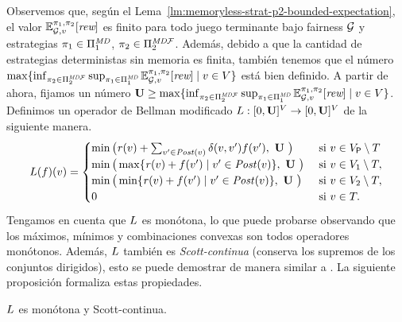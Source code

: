 Observemos que, según el Lema~\ref{lm:memoryless-strat-p2-bounded-expectation}, el valor $\mathbb{E}^{\pi_{1}, \pi_{2}}_{\mathcal{G},v}[\textit{rew}]$ es finito
para todo juego terminante bajo fairness $\mathcal{G}$ y estrategias $\pi_{1} \in \Pi^{\textit{MD}}_{1}$, $\pi_{2} \in \Pi^{\textit{MD}\mathcal{F}}_{2}$.
Además, debido a que la cantidad de estrategias deterministas sin memoria es finita, también tenemos que el número $\max \{ \inf_{\pi_{2} \in \Pi^{\textit{MD}\mathcal{F}}_{2}} \sup_{\pi_{1} \in \Pi^{\textit{MD}}_{1}} \mathbb{E}^{\pi_{1}, \pi_{ 2}}_{\mathcal{G},v}[\textit{rew}] \mid v \in V \}$ está bien definido.
A partir de ahora, fijamos un número $\mathbf{U} \geq \max \{ \inf_{\pi_{2} \in \Pi^{\textit{MD}\mathcal{F}}_{2}} \sup_{\pi_{1} \in \Pi^{\textit{MD}}_{1}} \mathbb{E}^{\pi_{1}, \pi_{2}}_{\mathcal{G},v}[\textit{rew}] \mid v \in V \}$. Definimos un operador de Bellman modificado $L: [0,\mathbf{U}]^V \rightarrow [0,\mathbf{U}]^V$ de la siguiente manera.
\[
    \Bellman(f)(v) =
    \begin{cases}
          \min \big( \reward(v) + \sum_{v' \in \post(v)} \delta(v,v')  f(v'),  \ \UpperBound \ \big ) &  \text{ si } v \in V_\Probabilistic \setminus T  \\
          \min\big( \max\{\reward(v)  + f(v') \mid v' \in \post(v) \}, \ \UpperBound  \ \big)& \text{ si } v \in  V_1 \setminus T, \\
          \min\big( \min\{\reward(v)  + f(v') \mid v' \in \post(v) \}, \ \UpperBound \ \big) & \text{ si } v \in  V_2 \setminus T, \\
           0 & \text{ si } v \in T.
    \end{cases}
\]
Tengamos en cuenta que $L$ es monótona, lo que puede probarse observando que los máximos, mínimos y combinaciones convexas son todos operadores monótonos.
Además, $L$ también es \emph{Scott-continua} (conserva los supremos de los conjuntos dirigidos), esto se puede demostrar de manera similar a \cite{DBLP:conf/memics/BrazdilKN12}. La siguiente proposición
formaliza estas propiedades.
\begin{proposition}\label{pn:continuity} $L$ es monótona y Scott-continua.
\end{proposition}


